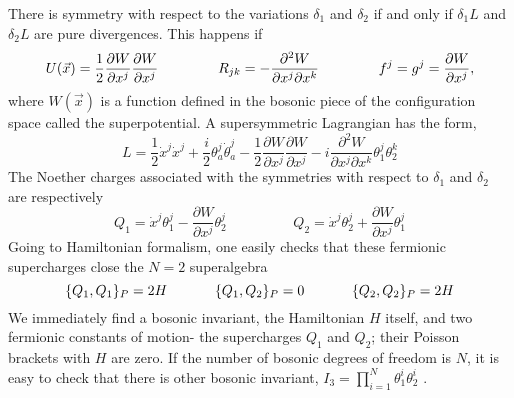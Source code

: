\documentclass[a4paper,11pt,twoside]{article}
\begin{document}
There is symmetry with respect to the variations $\delta_1$ and
$\delta_2$ if and only if $\delta_1 L$ and $\delta_2 L$ are pure
divergences. This happens if
\[
U(\vec{x})=\displaystyle\frac{1}{2} \displaystyle\frac{\partial
W}{\partial x^j} \displaystyle\frac{\partial W}{\partial x^j}
\hspace{1.5cm} R_{jk}=-\frac{\partial^2 W}{\partial x^j \partial
x^k} \hspace{1.5cm} f^j=g^j=\displaystyle\frac{\partial
W}{\partial x^j} ,
\]
where $W(\vec{x})$ is a function defined in the bosonic piece of
the configuration space called the superpotential. A
supersymmetric Lagrangian has the form,
\[
L=\displaystyle\frac{1}{2} \dot{x}^j \dot{x}^j
+\displaystyle\frac{i}{2} \theta_a^j \dot{\theta}_a^j
-\displaystyle\frac{1}{2} \displaystyle\frac{\partial W}{\partial
x^j}\displaystyle\frac{\partial W}{\partial x^j}-i
\displaystyle\frac{\partial^2 W}{\partial x^j \partial x^k}
\theta_1^j \theta_2^k
\]
The Noether charges associated with the symmetries with respect to
$\delta_1$ and $\delta_2$ are respectively
\[
Q_1=\dot{x}^j \theta_1^j- \displaystyle\frac{\partial W}{\partial
x^j} \theta_2^j \hspace{2cm} Q_2=\dot{x}^j \theta_2^j+
\displaystyle\frac{\partial W}{\partial x^j} \theta_1^j
\]
Going to Hamiltonian formalism, one easily checks that these
fermionic supercharges close the  $N=2$ superalgebra
\[
\{Q_1,Q_1 \}_P=2 H \hspace{1.2cm} \{Q_1,Q_2\}_P=0 \hspace{1.2cm} \{Q_2,Q_2\}_P=2 H
\]
We immediately find a bosonic invariant, the Hamiltonian $H$
itself, and two fermionic constants of motion- the supercharges
$Q_1$ and $Q_2$; their Poisson brackets with $H$ are zero. If the
number of bosonic degrees of freedom is $N$, it is easy to check
that there is other bosonic invariant,
$I_3=\prod_{i=1}^N\theta_1^i \theta_2^i$ \cite{Pl}.
\end{document}
